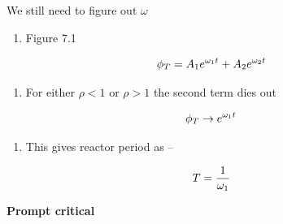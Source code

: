 \documentclass[aspectratio=1610,pdftex,dvipsnames,compress,xcolor={dvipsnames}]{beamer}
\begin{document}
\addtocounter{framenumber}{-1} 
\begin{frame}{We still need to figure out $\omega$}
    \begin{enumerate}[series=outerlist,topsep=0pt,itemsep=21pt,leftmargin=*,label=(\arabic*)]
        \item[]Figure 7.1
    \end{enumerate}

    \vspace*{\fill}

    \begin{equation}
        \LARGE
        \phi_T = A_1 e^{\omega_1 t} + A_2 e^{\omega_2 t}
    \end{equation}

    \vspace*{\fill}

    \begin{enumerate}[series=outerlist,topsep=0pt,itemsep=21pt,leftmargin=*,label=(\arabic*)]
        \item[]For either $\rho < 1$ or $\rho > 1$ the second term dies out
    \end{enumerate}

    \vspace*{\fill}

    \begin{equation}
        \LARGE
        \phi_T \rightarrow e^{\omega_1 t}
    \end{equation}

    \vspace*{\fill}

    \begin{enumerate}[series=outerlist,topsep=0pt,itemsep=21pt,leftmargin=*,label=(\arabic*)]
        \item[]This gives reactor period as --
    \end{enumerate}

    \vspace*{\fill}

    \begin{equation}
        \LARGE
        T = \frac{1}{\omega_1}
    \end{equation}
\end{frame}


\begin{frame}[plain]{}
    \centering\LARGE\textbf{Prompt critical}
\end{frame}
\end{document}
